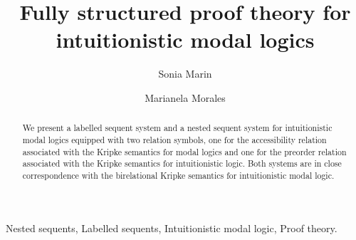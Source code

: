 \documentclass[twoside]{aiml20}
\begin{document}
\begin{frontmatter}
  \title{Fully structured proof theory for intuitionistic modal logics}
  \author{Sonia Marin}
  \address{University College London, UK}
  \author{Marianela Morales}
  \address{LIX, \'Ecole Polytechnique  \&  Inria Saclay, France}
  
  \begin{abstract}
  We present a labelled sequent system and a nested sequent system for intuitionistic modal logics equipped with two relation symbols, one for the accessibility relation associated with the Kripke semantics for modal logics and one for the preorder relation associated with the Kripke semantics for intuitionistic logic. Both systems are in close correspondence with the birelational Kripke semantics for intuitionistic modal logic.
  \end{abstract}

  \begin{keyword}
  Nested sequents, Labelled sequents, Intuitionistic modal logic, Proof theory.
  \end{keyword}
 \end{frontmatter}

%
\end{document}
